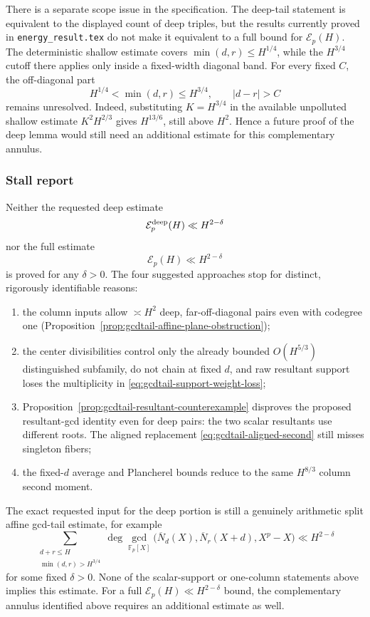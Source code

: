 There is a separate scope issue in the specification.  The deep-tail
statement is equivalent to the displayed count of deep triples, but the
results currently proved in \texttt{energy\_result.tex} do not make it
equivalent to a full bound for $\mathcal E_p(H)$.  The deterministic
shallow estimate covers $\min(d,r)\leq H^{1/4}$, while the
$H^{3/4}$ cutoff there applies only inside a fixed-width diagonal band.
For every fixed $C$, the off-diagonal part
\[
 H^{1/4}<\min(d,r)\leq H^{3/4},\qquad |d-r|>C
\]
remains unresolved.  Indeed, substituting $K=H^{3/4}$ in the available
unpolluted shallow estimate $K^2H^{2/3}$ gives $H^{13/6}$, still above
$H^2$.  Hence a future proof of the deep lemma would still need an
additional estimate for this complementary annulus.

\subsubsection{Stall report}

Neither the requested deep estimate
\[
 \mathcal E_p^{\rm deep}(H)\ll H^{2-\delta}
\]
nor the full estimate
\[
 \mathcal E_p(H)\ll H^{2-\delta}
\]
is proved for any $\delta>0$.  The four suggested approaches stop for
distinct, rigorously identifiable reasons:
\begin{enumerate}
 \item the column inputs allow $\asymp H^2$ deep, far-off-diagonal pairs
       even with codegree one
       (Proposition~\ref{prop:gcdtail-affine-plane-obstruction});
 \item the center divisibilities control only the already bounded
       $O(H^{5/3})$ distinguished subfamily, do not chain at fixed $d$,
       and raw resultant support loses the multiplicity in
       \eqref{eq:gcdtail-support-weight-loss};
 \item Proposition~\ref{prop:gcdtail-resultant-counterexample} disproves
       the proposed resultant-gcd identity even for deep pairs: the two
       scalar resultants use different roots.  The aligned replacement
       \eqref{eq:gcdtail-aligned-second} still misses singleton fibers;
 \item the fixed-$d$ average and Plancherel bounds reduce to the same
       $H^{8/3}$ column second moment.
\end{enumerate}
The exact requested input for the deep portion is still a genuinely
arithmetic split affine gcd-tail estimate, for example
\[
 \sum_{\substack{d+r\leq H\\\min(d,r)>H^{3/4}}}
 \deg\gcd_{\mathbb F_p[X]}
 \bigl(\overline N_d(X),\overline N_r(X+d),X^p-X\bigr)
 \ll H^{2-\delta}
\]
for some fixed $\delta>0$.  None of the scalar-support or one-column
statements above implies this estimate.  For a full
$\mathcal E_p(H)\ll H^{2-\delta}$ bound, the complementary annulus
identified above requires an additional estimate as well.

